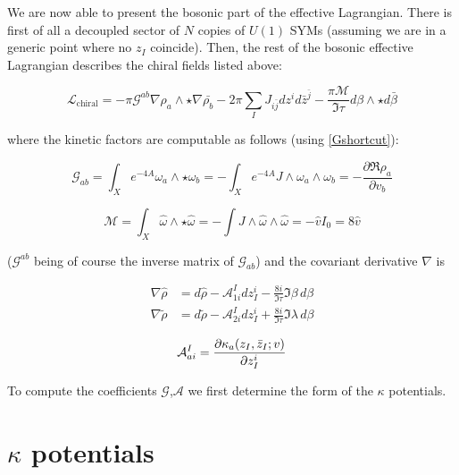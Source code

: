 We are now able to present the bosonic part of the effective Lagrangian. There is first of all a decoupled sector of $N$ copies of $U(1)$ SYMs (assuming we are in a generic point where no $z_I$ coincide). Then, the rest of the bosonic effective Lagrangian describes the chiral fields listed above:

\begin{equation}
	\mathcal{L}_\mathrm{chiral} = - \pi \mathcal{G}^{ab} \nabla \rho_a \wedge \star \nabla \bar {\rho_b} - 2 \pi \sum_I J_{i\bar j} dz^i d\bar{z}^{\bar j} - \frac{\pi\mathcal{M}}{\Im \tau} d\beta \wedge \star d\bar\beta
	\label{y20lagrangian}
\end{equation}

where the kinetic factors are computable as follows (using \eqref{Gshortcut}):

\begin{equation}
	\mathcal{G}_{ab} = \int_X e^{-4A} \omega_a \wedge \star \omega_b = - \int_X e^{-4A} J \wedge \omega_a \wedge \omega_b = - \frac{\partial \Re \rho_a}{\partial v_b}
	\label{}
\end{equation}

\begin{equation}
	\mathcal{M} = \int_X \hat \omega \wedge \star \hat \omega = - \int J \wedge \hat \omega \wedge \hat \omega = - \hat v I_0 = 8 \hat v
	\label{Mfinal}
\end{equation}

($\mathcal G^{ab}$ being of course the inverse matrix of $\mathcal G_{ab}$) and the covariant derivative $\nabla$ is

\begin{align}
	\nabla \hat \rho &= d \hat \rho - \mathcal{A}_{1i}^{I} dz_I^i - \frac{8i}{\Im \tau} \Im \beta \, d\beta\\
	\nabla \tilde \rho &= d \tilde \rho - \mathcal{A}_{2i}^{I} dz_I^i + \frac{8i}{\Im \tau} \Im \lambda \, d\beta
	\label{}
\end{align}

\begin{equation}
	\mathcal{A}_{ai}^I = \frac{\partial\kappa_a(z_I,\bar z_I; v)}{\partial z_I^i}
	\label{}
\end{equation}

To compute the coefficients $\mathcal{G}$,$\mathcal{A}$ we first determine the form of the $\kappa$ potentials.

\section{$\kappa$ potentials}


